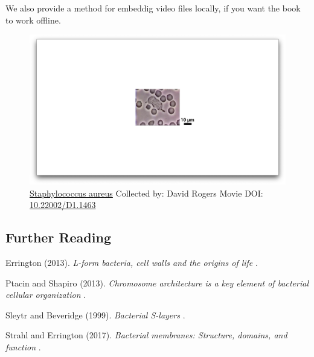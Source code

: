 \documentclass[]{tufte-book}
\begin{document}
We also provide a method for embeddig video files locally, if you want
the book to work offline.

\begin{figure}
\includegraphics{movie_stills/1_1} \caption[\protect\hyperlink{methods}{Staphylococcus aureus} Collected
by: David Rogers Movie DOI:
\href{https://doi.org/10.22002/D1.1463}{10.22002/D1.1463}]{\protect\hyperlink{methods}{Staphylococcus aureus} Collected
by: David Rogers Movie DOI:
\href{https://doi.org/10.22002/D1.1463}{10.22002/D1.1463}}\label{fig:1-1-embed}
\end{figure}

\subsection*{Further Reading}\label{further-reading}

Errington (2013). \emph{L-form bacteria, cell walls and the origins of
life} \citep{errington2013}.

Ptacin and Shapiro (2013). \emph{Chromosome architecture is a key
element of bacterial cellular organization} \citep{ptacin2013}.

Sleytr and Beveridge (1999). \emph{Bacterial S-layers}
\citep{sleytr1999}.

Strahl and Errington (2017). \emph{Bacterial membranes: Structure,
domains, and function} \citep{strahl2017}.


\end{document}
